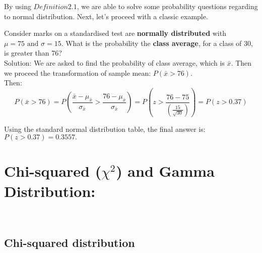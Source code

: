 By using $Definition 2.1$, we are able to solve some probability questions regarding to normal distribution. Next, let's proceed with a classic example.\\

\begin{example}
Consider marks on a standardised test are \textbf{normally distributed} with $\mu = 75 \text{ and } \sigma = 15$. What is the probability the \textbf{class average}, for a class of 30, is greater than 76?\\

Solution: We are asked to find the probability of class average, which is $\bar{x}$. Then we proceed the transformation of sample mean: $P( \bar{x} > 76)$.\\

Then: \[ P(\bar{x} > 76) = P( \frac{ \bar{x} - \mu_{ \bar{x}} }{ \sigma_{\bar{x}}} > \frac{ 76 - \mu_{ \bar{x}}}{\sigma_{\bar{x}}}) = P(z > \frac{76 - 75}{(\frac{15}{\sqrt{30}})}) = P( z > 0.37)\]

Using the standard normal distribution table, the final answer is: $P(z>0.37) = 0.3557.$
\end{example}

\section{Chi-squared ($\chi^{2}$) and Gamma Distribution:}\\

\subsection{Chi-squared distribution}

\noident












